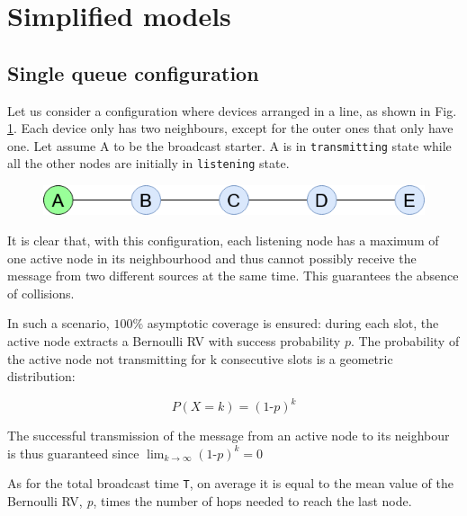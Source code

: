 \section{Simplified models}

\subsection{Single queue configuration}

Let us consider a configuration where devices arranged in a line, as shown in Fig. \ref{fig:single_queue}. Each device only has two neighbours, except for the outer ones that only have one. Let assume A to be the broadcast starter. A is in \texttt{transmitting} state while all the other nodes are initially in \texttt{listening} state. 
\hfill \break
\hfill \break

\begin{figure}[H]%
    \centering
	{{\includegraphics[scale=0.6]{img/single_queue.png} }}%
    \caption{}%
    \label{fig:single_queue}%
\end{figure}

It is clear that, with this configuration, each listening node has a maximum of one active node in its neighbourhood and thus cannot possibly receive the message from two different sources at the same time.
This guarantees the absence of collisions.

In such a scenario, $100\%$ asymptotic coverage is ensured:
during each slot, the active node extracts a Bernoulli RV with success probability $p$. The probability of the active node not transmitting for k consecutive slots is a geometric distribution:

\begin{equation}
	P(X = k) = (1\text{-}p)^{k}
	\label{geometric_distribution}
\end{equation}

The successful transmission of the message from an active node to its neighbour is thus guaranteed since $\lim_{k \to \infty} (1\text{-}p)^{k} = 0$

As for the total broadcast time \texttt{T}, on average it is equal to the mean value of the Bernoulli RV, \textit{p}, times the number of hops needed to reach the last node.


